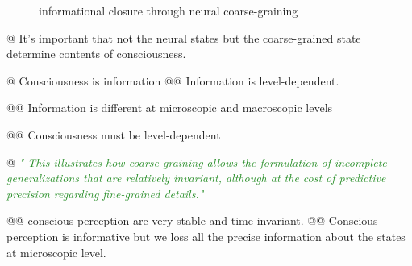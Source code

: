 \documentclass[utf8]{article}
\newenvironment{ants}
			{
			 \begin{easylist}[itemize]
			}
			{
			\end{easylist}
			}
\newcommand{\rewrite}[1]{\textcolor{ForestGreen}{\textit{"#1"}}\newline}
\newcommand{\includegraphicsTodo}[2][]{%
			\tcbox[%
				adjusted title=\LARGE To Be Modified,
				halign title=right,
				colbacktitle=Orange!75!White,
				coltitle=Black,
				colframe=Red!60!White,
				boxrule=1mm,
				colback=white%
				]{\texttt{[image: \#2]}}}
\begin{document}
		
		
		\begin{figure}[H]
			\includegraphicsTodo[width=\textwidth]{CGandIC.png}
			\caption{informational closure through neural coarse-graining}
			\label{fig:CGandIC}
		\end{figure}
	
		
		\begin{ants}
			@ It's important that not the neural states but the coarse-grained state determine contents of consciousness. 
			
			@ Consciousness is information 
				@@ Information is level-dependent.
				
				@@ Information is different at microscopic and macroscopic levels
				
				@@ Consciousness must be level-dependent 		
				
			
			@ \rewrite{
				This illustrates how coarse-graining allows the formulation of incomplete generalizations that are relatively invariant, although at the cost of predictive precision regarding fine-grained details.} \cite{price2007causation}
			
				@@ conscious perception are very stable and time invariant.
				@@ Conscious perception is informative but we loss all the precise information about the states at microscopic level. 
		\end{ants}
		   
		
		
\end{document}
